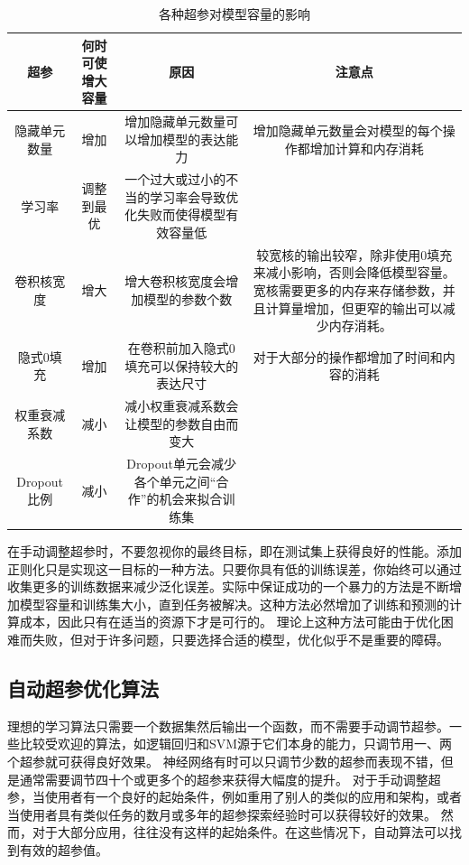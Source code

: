 \begin{table}[!hbp]
    \begin{tabular}{|c|c|c|c|}
        \hline
        \hline
        超参 & 何时可使增大容量 & 原因 & 注意点 \\
        \hline
        隐藏单元数量 & 增加 & 增加隐藏单元数量可以增加模型的表达能力 & 增加隐藏单元数量会对模型的每个操作都增加计算和内存消耗 \\
        \hline
        学习率 & 调整到最优 & 一个过大或过小的不当的学习率会导致优化失败而使得模型有效容量低 & \\
        \hline
        卷积核宽度 & 增大 & 增大卷积核宽度会增加模型的参数个数 & 较宽核的输出较窄，除非使用0填充来减小影响，否则会降低模型容量。宽核需要更多的内存来存储参数，并且计算量增加，但更窄的输出可以减少内存消耗。 \\
        \hline
        隐式0填充 & 增加 & 在卷积前加入隐式0填充可以保持较大的表达尺寸 & 对于大部分的操作都增加了时间和内容的消耗 \\
        \hline
        权重衰减系数 & 减小 & 减小权重衰减系数会让模型的参数自由而变大 &  \\
        \hline
        Dropout比例 & 减小 & Dropout单元会减少各个单元之间“合作”的机会来拟合训练集 &  \\
        \hline
        \hline
    \end{tabular}
    \caption{各种超参对模型容量的影响}
    \label{tab:11.1}
\end{table}

在手动调整超参时，不要忽视你的最终目标，即在测试集上获得良好的性能。添加正则化只是实现这一目标的一种方法。只要你具有低的训练误差，你始终可以通过收集更多的训练数据来减少泛化误差。实际中保证成功的一个暴力的方法是不断增加模型容量和训练集大小，直到任务被解决。这种方法必然增加了训练和预测的计算成本，因此只有在适当的资源下才是可行的。 理论上这种方法可能由于优化困难而失败，但对于许多问题，只要选择合适的模型，优化似乎不是重要的障碍。


\subsection{自动超参优化算法}
理想的学习算法只需要一个数据集然后输出一个函数，而不需要手动调节超参。一些比较受欢迎的算法，如逻辑回归和SVM源于它们本身的能力，只调节用一、两个超参就可获得良好效果。 神经网络有时可以只调节少数的超参而表现不错，但是通常需要调节四十个或更多个的超参来获得大幅度的提升。 对于手动调整超参，当使用者有一个良好的起始条件，例如重用了别人的类似的应用和架构，或者当使用者具有类似任务的数月或多年的超参探索经验时可以获得较好的效果。 然而，对于大部分应用，往往没有这样的起始条件。在这些情况下，自动算法可以找到有效的超参值。

